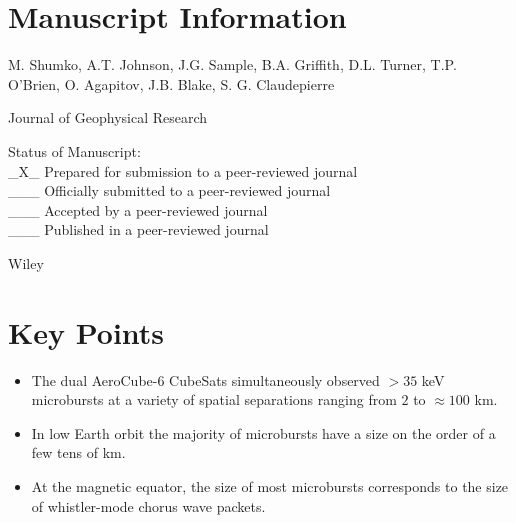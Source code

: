 \section{Manuscript Information}

\begin{singlespace} \noindent M. Shumko, A.T. Johnson, J.G. Sample, B.A. Griffith, D.L. Turner, T.P. O’Brien, O. Agapitov, J.B. Blake, S. G. Claudepierre \end{singlespace}

\noindent Journal of Geophysical Research

\begin{singlespace}
\noindent Status of Manuscript: \\
\_X\_ Prepared for submission to a peer-reviewed journal \\
\_\_\_ Officially submitted to a peer-reviewed journal \\
\_\_\_ Accepted by a peer-reviewed journal \\ 
\_\_\_ Published in a peer-reviewed journal
\end{singlespace}


\noindent Wiley

\newpage

\section{Key Points}
\begin{itemize}
\item The dual AeroCube-6 CubeSats simultaneously observed $> 35$ keV microbursts at a variety of spatial separations ranging from $2$ to $\approx 100$ km.
\item In low Earth orbit the majority of microbursts have a size on the order of a few tens of km.
\item At the magnetic equator, the size of most microbursts corresponds to the size of whistler-mode chorus wave packets.
\end{itemize}

